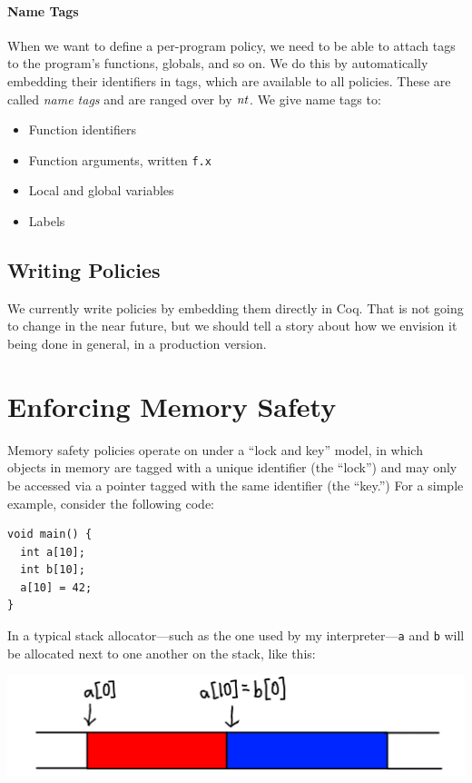 \documentclass[acmsmall,review,anonymous]{acmart}\settopmatter{printfolios=true,printccs=false,printacmref=false}
\begin{document}
\paragraph*{Name Tags}

When we want to define a per-program policy, we need to be able to attach tags to the program's
functions, globals, and so on. We do this by automatically embedding their identifiers in tags,
which are available to all policies. These are called {\em name tags} and are ranged over by
\(\mathit{nt}\). We give name tags to:
\begin{itemize}
\item Function identifiers
\item Function arguments, written {\tt f.x}
\item Local and global variables
\item Labels
\end{itemize}

\subsection{Writing Policies}

We currently write policies by embedding them directly in Coq. That is not going to change in the near future,
but we should tell a story about how we envision it being done in general, in a production version.

\section{Enforcing Memory Safety}
\label{sec:memsafe}

Memory safety policies operate on under a ``lock and key'' model, in which objects in memory
are tagged with a unique identifier (the ``lock'') and may only be accessed via a pointer tagged
with the same identifier (the ``key.'') For a simple example, consider the following code:
%
\vspace{\abovedisplayskip}
\begin{verbatim}
void main() {
  int a[10];
  int b[10];
  a[10] = 42;    
}
\end{verbatim}
\vspace{\belowdisplayskip}
%
In a typical stack allocator---such as the one used by my interpreter---{\tt a} and {\tt b} will
be allocated next to one another on the stack, like this:

\includegraphics[width=.5\textwidth]{example.png}
\end{document}
